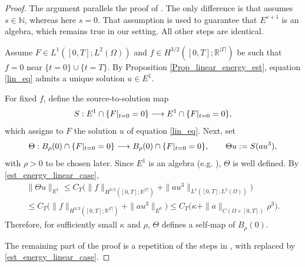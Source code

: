 \documentclass[11pt]{amsart}
\theoremstyle{definition}
\theoremstyle{plain}
\numberwithin{equation}{section}
\begin{document}
\begin{proof}
The argument parallels the proof of \cite[Lemma 1]{LassasLiimatainenPotenciano-MachadoTyni}. The only difference is that \cite[Lemma 1]{LassasLiimatainenPotenciano-MachadoTyni} assumes $s \in \mathbb{N}$, whereas here $s=0$. That assumption is used to guarantee that $E^{s+1}$ is an algebra, which remains true in our setting. All other steps are identical.  

Assume $F \in L^1([0,T];L^2(\Omega))$ and $f \in H^{3/2}([0,T];\mathbb{R}^{|\Gamma|})$ be such that $f = 0$ near $\{t=0\}\cup\{t=T\}$. By Proposition \ref{Prop_linear_energy_est}, equation \eqref{lin_eq} admits a unique solution $u \in E^1$.  

For fixed $f$, define the source-to-solution map
\begin{equation*}
   S : E^1 \cap \{F\arrowvert_{t=0} = 0\} \longrightarrow E^1 \cap \{F\arrowvert_{t=0} = 0\},
\end{equation*}
which assigns to $F$ the solution $u$ of equation \eqref{lin_eq}. Next, set
\begin{equation*}
   \Theta : B_\rho(0) \cap \{F\arrowvert_{t=0} = 0\} \longrightarrow B_\rho(0) \cap \{F\arrowvert_{t=0}=0\}, 
   \qquad \Theta u := S(au^3),
\end{equation*}
with $\rho>0$ to be chosen later. Since $E^1$ is an algebra (e.g. \cite{AF}), $\Theta$ is well defined. By \eqref{est_energy_linear_case},
\begin{multline*}
   \|\Theta u\|_{E^1} 
   \leq C_T \bigl(\|f\|_{H^{3/2}([0,T];\mathbb{R}^{|\Gamma|})} + \|au^3\|_{L^1([0,T]; L^2(\Omega))}\bigr) \\
   \leq C_T \bigl(\|f\|_{H^{3/2}([0,T];\mathbb{R}^{|\Gamma|})} + \|au^3\|_{E^0}\bigr) 
   \leq C_T\bigl(\kappa + \|a\|_{C(\Omega\times[0,T])}\rho^3\bigr).
\end{multline*}
Therefore, for sufficiently small $\kappa$ and $\rho$, $\Theta$ defines a self-map of $B_\rho(0)$.


The remaining part of the proof is a repetition of the steps in \cite[Lemma 1]{LassasLiimatainenPotenciano-MachadoTyni}, with \cite[estimate (16)]{LassasLiimatainenPotenciano-MachadoTyni} replaced by \eqref{est_energy_linear_case}. 
\end{proof}
\end{document}
